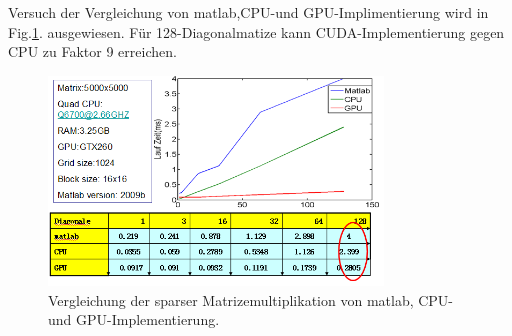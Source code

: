 

Versuch der Vergleichung von matlab,CPU-und GPU-Implimentierung wird in Fig.\ref{compareSparse}. ausgewiesen. Für 128-Diagonalmatize kann CUDA-Implementierung gegen CPU zu Faktor 9 erreichen.


\begin{figure}[htbp]
\includegraphics[width=3.5in]{../xby/pic//compareSparse}
\caption{Vergleichung der sparser Matrizemultiplikation von matlab, CPU-und GPU-Implementierung.}
\label{compareSparse}
\end{figure}